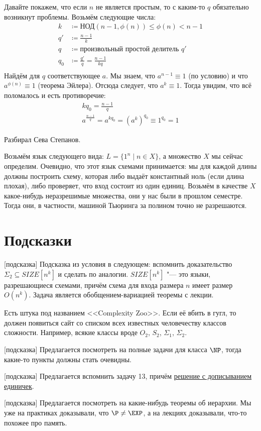 	Давайте покажем, что если $n$ не является простым, то с каким-то $q$ обязательно возникнут проблемы.
	Возьмём следующие числа:
	\begin{align*}
		k &\coloneq \textrm{НОД}(n-1, \phi(n)) \le \phi(n) < n - 1 \\
		q' &\coloneq \frac{n-1}{k} \\
		q &\coloneq \text{произвольный простой делитель $q'$} \\
		q_0 &\coloneq \frac{q'}{q} = \frac{n-1}{kq} \\
	\end{align*}
	Найдём для $q$ соответствующее $a$.
	Мы знаем, что $a^{n-1} \equiv 1$ (по условию) и что $a^{\phi(n)} \equiv 1$ (теорема Эйлера).
	Отсюда следует, что $a^k \equiv 1$.
	Тогда увидим, что всё поломалось и есть противоречие:
	\begin{gather*}
		kq_0 = \frac{n-1}q \\
		a^{\frac{n-1}{q}} = a^{kq_0} = (a^k)^{q_0} \equiv 1^{q_0} = 1
	\end{gather*}

	Разбирал Сева Степанов.

	Возьмём язык следующего вида: $L = \{1^n \mid n \in X\}$, а множество
	$X$ мы сейчас определим.
	Очевидно, что этот язык схемами принимается: мы для каждой длины должны построить схему,
	которая либо выдаёт константный ноль (если длина плохая), либо проверяет, что вход состоит
	из один единиц.
	Возьмём в качестве $X$ какое-нибудь неразрешимые множества, они у нас были в прошлом семестре.
	Тогда они, в частности, машиной Тьюринга за полином точно не разрешаются.

\section{Подсказки}
[подсказка]
	Подсказка из условия в следующем: вспомнить доказательство $\Sigma_2 \subseteq SIZE[n^k]$
	и сделать по аналогии.
	$SIZE[n^k]$ "--- это языки, разрешающиеся схемами, причём схема для входа размера $n$ имеет размер $O(n^k)$.
	Задача является обобщением-вариацией теоремы с лекции.

	Есть штука под названием <<Complexity Zoo>>.
	Если её вбить в гугл, то должен появиться сайт со списком всех известных человечеству классов сложности.
	Например, всякие классы вроде $O_2$, $S_2$, $\Sigma_1$, $\Sigma_2$.

[подсказка]
	Предлагается посмотреть на полные задачи для класса $\NP$, тогда какие-то пункты должны стать очевидны.

[подсказка]
	Предлагается вспомнить задачу 13, причём \hyperref[prob13_sol2]{решение с дописыванием единичек}.

[подсказка]
	Предлагается посмотреть на какие-нибудь теоремы об иерархии.
	Мы уже на практиках доказывали, что $\P \neq \EXP$, а на лекциях доказывали, что-то похожее про память.
